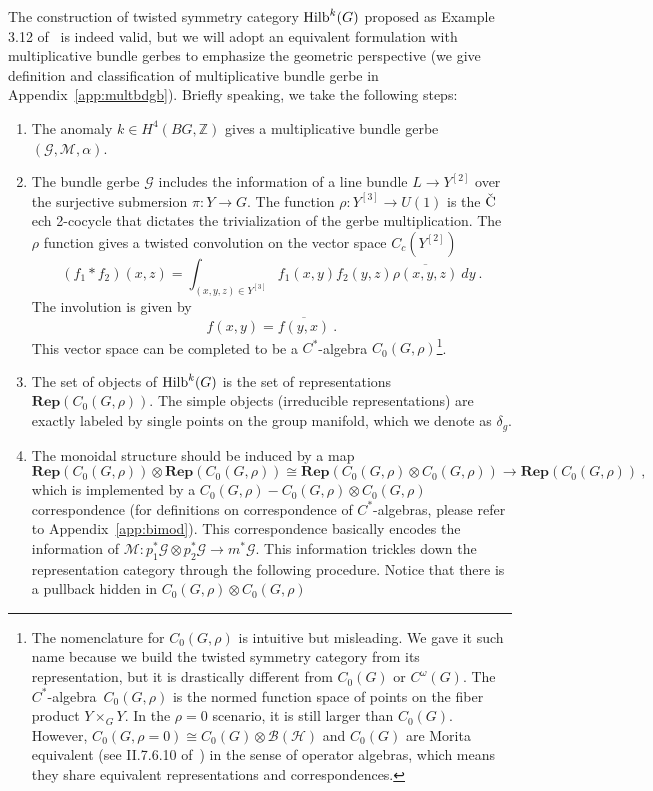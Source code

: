 \documentclass[a4paper,11pt]{article}
\newcommand{\Ch}{\mathrm{Ch}}
\newcommand{\CH}{\Ch_{\mu_1\mu_2}(Q_F,{t},{q})}
\newcommand{\Rep}{\textbf{Rep}}
\newcommand{\be}{\begin{equation}}
\newcommand{\ee}{\end{equation}}
\def\bbZ{\mathbb{Z}}
\def\CH{\mathcal{H}}
\def\calg{$C^*$-algebra\ }
\def\hilb{{\rm Hilb}}
\begin{document}
The construction of twisted symmetry category ${\rm Hilb}^k(G)$ proposed as Example 3.12 of~\cite{Marin-Salvador:2025stc} is indeed valid, but we will adopt an equivalent formulation with multiplicative bundle gerbes to emphasize the geometric perspective (we give definition and classification of multiplicative bundle gerbe in Appendix~\ref{app:multbdgb}). Briefly speaking, we take the following steps:
\begin{enumerate}
    \item The anomaly $k\in H^4(BG,\bbZ)$ gives a multiplicative bundle gerbe $(\mathscr{G},\mathscr{M},\alpha)$.
    \item The bundle gerbe $\mathscr{G}$ includes the information of a line bundle $L\to Y^{[2]}$ over the surjective submersion $\pi : Y\to G$. The function $\rho: Y^{[3]} \to U(1)$  is the $\check{\rm C}$ech 2-cocycle that dictates the trivialization of the gerbe multiplication. The $\rho$ function gives a twisted convolution on the vector space $C_c(Y^{[2]})$
    \be  (f_1*f_2)(x,z) = \int_{(x,y,z)\in Y^{[3]}} f_1(x,y) f_2(y,z) \overline{\rho(x,y,z)} \ dy \ .  \ee
    The involution is given by
    \be f(x,y )=  \overline{f(y,x)} \ .  \ee
    This vector space can be completed to be a $C^*$-algebra $C_0(G,\rho)$\footnote{The nomenclature for $C_0(G,\rho)$ is intuitive but misleading. We gave it such name because we build the twisted symmetry category from its representation, but it is drastically different from $C_0(G)$ or $C^\omega(G)$. The \calg $C_0(G,\rho)$ is the normed function space of points on the fiber product $Y\times_G Y$. In the $\rho = 0$ scenario, it is still larger than $C_0(G)$. However, $C_0(G,\rho = 0) \cong C_0(G)\otimes \mathscr{B}(\CH)$ and $C_0(G)$ are Morita equivalent (see II.7.6.10 of~\cite{Blackadar:2006}) in the sense of operator algebras, which means they share equivalent representations and correspondences.}.
    \item The set of objects of $\hilb^k(G)$ is the set of representations $\Rep(C_0(G,\rho))$. The simple objects (irreducible representations) are exactly labeled by single points on the group manifold, which we denote as $\delta_g$.
    \item The monoidal structure should be induced by a map
    \be  \Rep(C_0(G,\rho))\otimes \Rep(C_0(G,\rho)) \cong  \Rep(C_0(G,\rho)\otimes C_0(G,\rho)) \to \Rep(C_0(G,\rho)) \ ,  \ee
    which is implemented by a $C_0(G,\rho)-C_0(G,\rho)\otimes C_0(G,\rho)$ correspondence (for definitions on correspondence of $C^*$-algebras, please refer to Appendix~\ref{app:bimod}). This correspondence basically encodes the information of $\mathscr{M}:p_1^*\mathscr{G}\otimes p^*_2\mathscr{G}\to m^*\mathscr{G}$. This information trickles down the representation category through the following procedure. Notice that there is a pullback hidden in $C_0(G,\rho)\otimes C_0(G,\rho)$

\end{enumerate}
\end{document}
